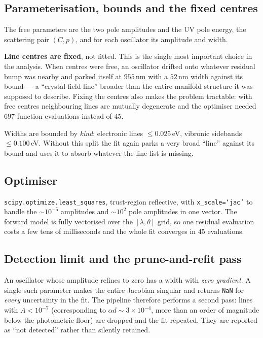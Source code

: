 \documentclass[11pt,a4paper]{article}
\newcommand{\ad}{\alpha d}
\newcommand{\lam}{\lambda}
\begin{document}
\subsection{Parameterisation, bounds and the fixed centres}

The free parameters are the two pole amplitudes and the UV pole energy, the
scattering pair $(C,p)$, and for each oscillator its amplitude and width.

\textbf{Line centres are fixed}, not fitted. This is the single most important
choice in the analysis. When centres were free, an oscillator drifted onto
whatever residual bump was nearby and parked itself at $955$\,nm with a $52$\,nm
width against its bound --- a ``crystal-field line'' broader than the entire
manifold structure it was supposed to describe. Fixing the centres also makes
the problem tractable: with free centres neighbouring lines are mutually
degenerate and the optimiser needed $697$ function evaluations instead of $45$.

Widths are bounded by \emph{kind}: electronic lines $\le0.025$\,eV, vibronic
sidebands $\le0.100$\,eV. Without this split the fit again parks a very broad
``line'' against its bound and uses it to absorb whatever the line list is
missing.

\subsection{Optimiser}

\texttt{scipy.optimize.least\_squares}, trust-region reflective, with
\texttt{x\_scale=`jac'} to handle the $\sim10^{-5}$ amplitudes and $\sim10^{2}$
pole amplitudes in one vector. The forward model is fully vectorised over the
$[\lam,\theta]$ grid, so one residual evaluation costs a few tens of
milliseconds and the whole fit converges in $45$ evaluations.

\subsection{Detection limit and the prune-and-refit pass}

An oscillator whose amplitude refines to zero has a width with \emph{zero
gradient}. A single such parameter makes the entire Jacobian singular and
returns \texttt{NaN} for \emph{every} uncertainty in the fit. The pipeline
therefore performs a second pass: lines with $A<10^{-7}$ (corresponding to
$\ad\sim3\times10^{-4}$, more than an order of magnitude below the photometric
floor) are dropped and the fit repeated. They are reported as ``not detected''
rather than silently retained.
\end{document}

